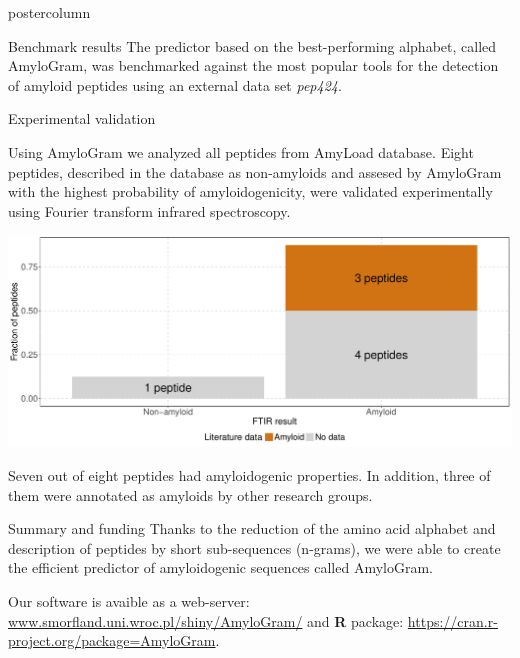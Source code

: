 \documentclass[final]{beamer}\usepackage[]{graphicx}\usepackage[]{color}
\makeatletter
\def\maxwidth{ %
  \ifdim\Gin@nat@width>\linewidth
    \linewidth
  \else
    \Gin@nat@width
  \fi
}
\newenvironment{knitrout}{}{} %
\makeatother
\begin{document}
\begin{frame}
\begin{columns}
\begin{column}{.48\textwidth}
\begin{beamercolorbox}[center,wd=\textwidth]{postercolumn}
\begin{minipage}[T]{.95\textwidth}
{\begin{block}{Benchmark results}
The predictor based on the best-performing alphabet, called AmyloGram, was benchmarked against the most popular tools for the detection of amyloid peptides using an external data set \textit{pep424}.

\end{block}
\vfill


\begin{block}{Experimental validation}

Using AmyloGram we analyzed all peptides from AmyLoad database. Eight peptides, described in the database as non-amyloids and assesed by AmyloGram with the highest probability of amyloidogenicity, were validated experimentally using Fourier transform infrared spectroscopy.

\begin{knitrout}
\color{fgcolor}

{\centering \includegraphics[width=\maxwidth]{figure/unnamed-chunk-3-1} 

}



\end{knitrout}

Seven out of eight peptides had amyloidogenic properties. In addition, three of them were annotated as amyloids by other research groups.

\end{block}
\vfill


\begin{block}{Summary and funding}
Thanks to the reduction of the amino acid alphabet and description of peptides by 
short sub-sequences (n-grams), we were able to create the efficient predictor 
of amyloidogenic sequences called AmyloGram.

\bigskip

Our software is avaible as a web-server: \url{www.smorfland.uni.wroc.pl/shiny/AmyloGram/} and \textbf{R} package: \url{https://cran.r-project.org/package=AmyloGram}.


\end{block}}
\end{minipage}
\end{beamercolorbox}
\end{column}
\end{columns}
\end{frame}
\end{document}
